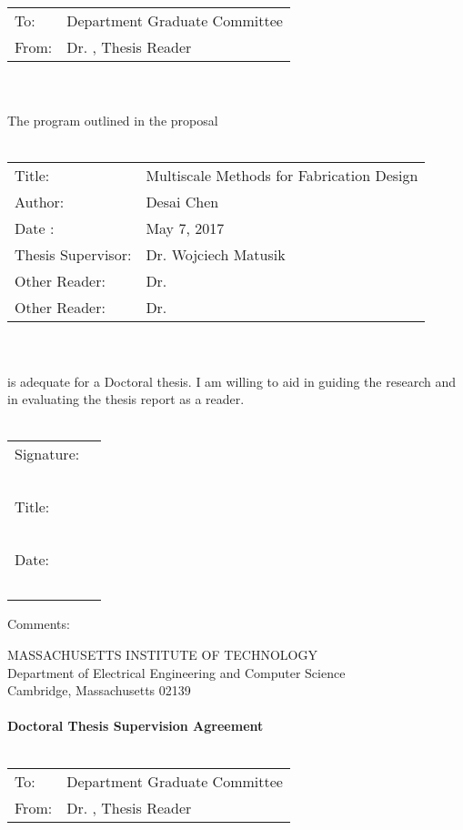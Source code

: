 \documentclass[11pt]{article}
\begin{document}
\begin{tabular}{p{2cm} p{10cm}}
	To: & Department Graduate Committee \\
	From: & Dr. , Thesis Reader
\end{tabular}\\~\\
The program outlined in the proposal\\~\\
\begin{tabular}{p{4cm} l}
	Title: & Multiscale Methods for Fabrication Design\\
	Author: & Desai Chen\\
	Date : & May 7, 2017 \\
	Thesis Supervisor: & Dr. Wojciech Matusik\\
	Other Reader: & Dr.\\
	Other Reader: & Dr.
\end{tabular}\\~\\
is adequate for a Doctoral thesis. I am willing to aid in guiding the research and in
evaluating the thesis report as a reader.\\~\\
\begin{flushright}
	\begin{tabular}{l l}
		Signature: & \underline{\hspace{6cm}}\\~\\
		Title: & \underline{\hspace{6cm}}\\~\\
		Date: & \underline{\hspace{6cm}}\\~\\
	\end{tabular}
\end{flushright}
Comments:
\newpage
\begin{center}
	MASSACHUSETTS INSTITUTE OF TECHNOLOGY\\
	Department of Electrical Engineering and Computer Science\\
	Cambridge, Massachusetts 02139\\~\\
	\textbf{Doctoral Thesis Supervision Agreement}\\~\\
\end{center}
\begin{tabular}{p{2cm} p{10cm}}
	To: & Department Graduate Committee \\
	From: & Dr. , Thesis Reader
\end{tabular}\\~\\
\end{document}
